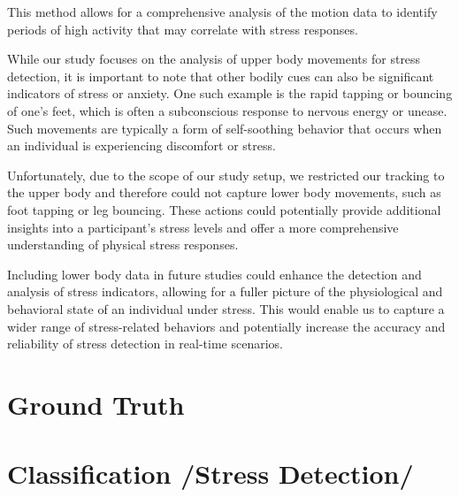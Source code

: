 This method allows for a comprehensive analysis of the motion data to identify periods of high activity that may correlate with stress responses.


While our study focuses on the analysis of upper body movements for stress detection, it is important to note that other bodily cues can also be significant indicators of stress or anxiety. One such example is the rapid tapping or bouncing of one's feet, which is often a subconscious response to nervous energy or unease. Such movements are typically a form of self-soothing behavior that occurs when an individual is experiencing discomfort or stress.

Unfortunately, due to the scope of our study setup, we restricted our tracking to the upper body and therefore could not capture lower body movements, such as foot tapping or leg bouncing. These actions could potentially provide additional insights into a participant's stress levels and offer a more comprehensive understanding of physical stress responses.

Including lower body data in future studies could enhance the detection and analysis of stress indicators, allowing for a fuller picture of the physiological and behavioral state of an individual under stress. This would enable us to capture a wider range of stress-related behaviors and potentially increase the accuracy and reliability of stress detection in real-time scenarios.


\section{Ground Truth}


\section{Classification /Stress Detection/}
